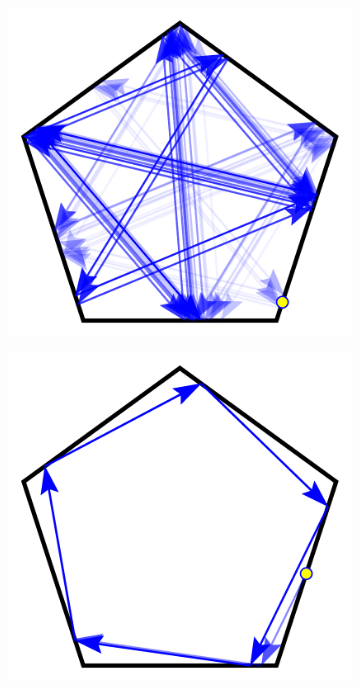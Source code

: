 \documentclass[letterpaper, 10 pt, conference]{ieeeconf}  %
\begin{document}
\begin{figure}
\begin{subfigure}{0.25\textwidth}

\end{subfigure}

\begin{subfigure}{0.25\textwidth}

\includegraphics[width=0.9\linewidth]{figs/pent_165rad.pdf}


\end{subfigure}%
\begin{subfigure}{0.25\textwidth}

\includegraphics[width=0.9\linewidth]{figs/pent_3rad.pdf}


\end{subfigure}
\end{figure}
\end{document}
